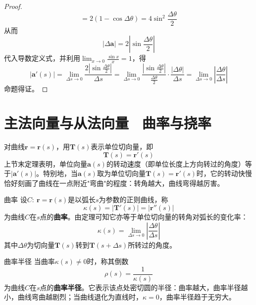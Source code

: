 \begin{proof}
\begin{equation}
		=2(1-\cos\Delta\theta)=4\sin^2\frac{\Delta\theta}{2}
	\end{equation}
	从而
	\begin{equation}
		|\Delta\mathbf{a}|=2\left|\sin\frac{\Delta\theta}{2}\right|
	\end{equation}
	代入导数定义式，并利用$\lim_{x\to 0}\frac{\sin x}{x}=1$，得
	\begin{equation}
		|\mathbf{a}'(s)|=\lim_{\Delta s\to 0}\frac{2\left|\sin\frac{\Delta\theta}{2}\right|}{\Delta s}
		=\lim_{\Delta s\to 0}\frac{\left|\sin\frac{\Delta\theta}{2}\right|}{\frac{\Delta\theta}{2}}\cdot\frac{|\Delta\theta|}{\Delta s}
		=\lim_{\Delta s\to 0}\left|\frac{\Delta\theta}{\Delta s}\right|
	\end{equation}
	命题得证。
\end{proof}



\section{主法向量与从法向量 \ 曲率与挠率}
对曲线$\mathbf{r}=\mathbf{r}(s)$，用$\mathbf{T}(s)$表示单位切向量，即$$\mathbf{T}(s)=\mathbf{r}'(s)$$
上节末定理表明，单位向量$\mathbf{a}(s)$的转动速度（即单位长度上方向转过的角度）等于$|\mathbf{a}'(s)|$。特别地，当$\mathbf{a}(s)$取为单位切向量$\mathbf{T}(s)=\mathbf{r}'(s)$时，它的转动快慢恰好刻画了曲线在一点附近"弯曲"的程度：转角越大，曲线弯得越厉害。

\begin{mydefinition}{曲率}
	设$C:\ \mathbf{r}=\mathbf{r}(s)$是以弧长$s$为参数的正则曲线，称
	\begin{equation}
		\label{eq:curvature}
		\kappa(s)=|\mathbf{T}'(s)|=|\mathbf{r}''(s)|
	\end{equation}
	为曲线$C$在$s$点的\textbf{曲率}。由定理可知它亦等于单位切向量的转角对弧长的变化率：
	\begin{equation}
		\kappa(s)=\lim_{\Delta s\to 0}\left|\frac{\Delta\theta}{\Delta s}\right|
	\end{equation}
	其中$\Delta\theta$为切向量$\mathbf{T}(s)$转到$\mathbf{T}(s+\Delta s)$所转过的角度。
\end{mydefinition}

\begin{mydefinition}{曲率半径}
	当曲率$\kappa(s)\neq 0$时，称其倒数
	\begin{equation}
		\label{eq:radius-of-curvature}
		\rho(s)=\frac{1}{\kappa(s)}
	\end{equation}
	为曲线$C$在$s$点的\textbf{曲率半径}。它表示该点处密切圆的半径：曲率越大，曲率半径越小，曲线弯曲越剧烈；当曲线退化为直线时，$\kappa=0$，曲率半径趋于无穷大。
\end{mydefinition}

